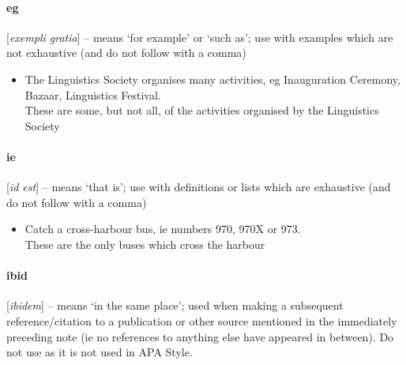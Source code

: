 \documentclass[11pt,a4paper]{book}
\newcommand{\cmark}{{\color{green(html/cssgreen)}\checkmark}}%
\begin{document}
		\paragraph{eg} [\textit{exempli gratia}] -- means `for example' or `such as'; use with examples which are not exhaustive (and do not follow with a comma)
		{\firasans \begin{mdframed}[backgroundcolor=aliceblue] \begin{itemize}[label=\cmark]
			\item The Linguistics Society organises many activities, eg Inauguration Ceremony, Bazaar, Linguistics Festival.\\
			\lbrack These are some, but not all, of the activities organised by the Linguistics Society\rbrack
		\end{itemize} \end{mdframed} }
				
		\paragraph{ie} [\textit{id est}] -- means `that is'; use with definitions or lists which are exhaustive (and do not follow with a comma)
		{\firasans \begin{mdframed}[backgroundcolor=aliceblue] \begin{itemize}[label=\cmark]
			\item Catch a cross-harbour bus, ie numbers 970, 970X or 973.\\
			\lbrack These are the only buses which cross the harbour\rbrack
		\end{itemize} \end{mdframed} }
		\paragraph{ibid} [\textit{ibidem}]  -- means `in the same place'; used when making a subsequent reference/citation to a publication or other source mentioned in the immediately preceding note (ie no references to anything else have appeared in between). Do not use as it is not used in APA Style.
\end{document}
